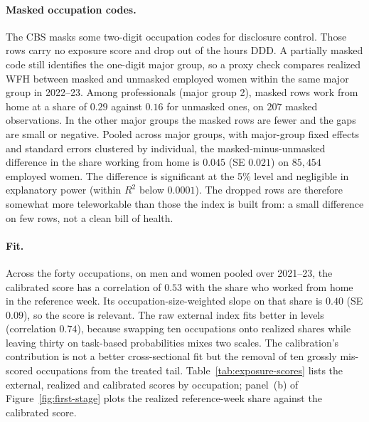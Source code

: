 \paragraph{Masked occupation codes.}
The CBS masks some two-digit occupation codes for disclosure control. Those rows carry no
exposure score and drop out of the hours DDD\@. A partially masked code still identifies the
one-digit major group, so a proxy check compares realized WFH between masked and unmasked
employed women within the same major group in 2022--23. Among professionals (major group 2),
masked rows work from home at a share of $0.29$ against $0.16$ for unmasked ones, on $207$
masked observations. In the other major groups the masked rows are fewer and the gaps are small
or negative. Pooled across major groups, with major-group fixed effects and standard errors
clustered by individual, the masked-minus-unmasked difference in the share working from home is
$0.045$ (SE $0.021$) on $85{,}454$ employed women. The difference is significant at the 5\%
level and negligible in explanatory power (within $R^2$ below $0.0001$). The dropped rows are
therefore somewhat more teleworkable than those the index is built from: a small difference on
few rows, not a clean bill of health.

\paragraph{Fit.}
Across the forty occupations, on men and women pooled over 2021--23, the calibrated score has a
correlation of $0.53$ with the share who worked from home in the reference week. Its
occupation-size-weighted slope on that share is $0.40$ (SE $0.09$), so the score is relevant.
The raw external index fits better in levels (correlation $0.74$), because swapping ten
occupations onto realized shares while leaving thirty on task-based probabilities mixes two
scales. The calibration's contribution is not a better cross-sectional fit but the removal of
ten grossly mis-scored occupations from the treated tail. Table~\ref{tab:exposure-scores} lists
the external, realized and calibrated scores by occupation; panel~(b) of
Figure~\ref{fig:first-stage} plots the realized reference-week share against the calibrated
score.

